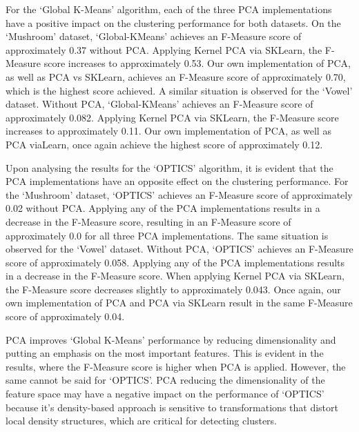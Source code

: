\vspace{1em}

For the `Global K-Means' algorithm, each of the three 
PCA implementations have a positive impact on the clustering performance for both datasets.
On the `Mushroom' dataset, `Global-KMeans' achieves an F-Measure score of approximately 0.37
without PCA. Applying Kernel PCA via SKLearn, the F-Measure score increases to approximately 0.53. 
Our own implementation of PCA, as well as PCA vs SKLearn, achieves an F-Measure score of approximately 0.70,
which is the highest score achieved.  
A similar situation is observed for the `Vowel' dataset. Without PCA, `Global-KMeans'
achieves an F-Measure score of approximately 0.082. Applying Kernel PCA via SKLearn,
the F-Measure score increases to approximately 0.11. Our own implementation of PCA,
as well as PCA viaLearn, once again achieve the highest score of approximately 0.12.

\vspace{1em}

Upon analysing the results for the `OPTICS' algorithm, it is evident that the PCA implementations
have an opposite effect on the clustering performance. For the `Mushroom' dataset, `OPTICS' achieves
an F-Measure score of approximately 0.02 without PCA. Applying any of the PCA implementations
results in a decrease in the F-Measure score, resulting in an F-Measure score of approximately 0.0 
for all three PCA implementations.
The same situation is observed for the `Vowel' dataset. Without PCA, `OPTICS' achieves an F-Measure score
of approximately 0.058. Applying any of the PCA implementations results in a decrease in the F-Measure score.
When applying Kernel PCA via SKLearn, the F-Measure score decreases slightly to approximately 0.043.
Once again, our own implementation of PCA and PCA via SKLearn result in the same F-Measure
score of approximately 0.04.

\vspace{1em}

PCA improves `Global K-Means' performance by reducing dimensionality and putting 
an emphasis on the most important features. This is evident in the results, where the
F-Measure score is higher when PCA is applied. However, the same cannot be said for `OPTICS'.
PCA reducing the dimensionality of the feature space may have a negative
impact on the performance of `OPTICS' because it's density-based approach is sensitive
to transformations that distort local density structures, which are critical for detecting
clusters\cite{sepin2023comparisonclusteringalgorithmsstatistical}.

